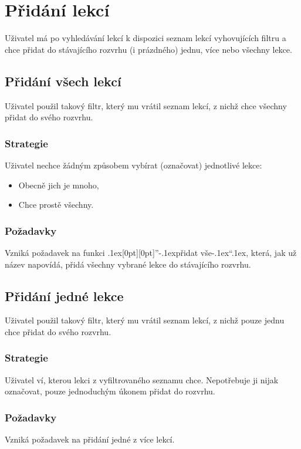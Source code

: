 \documentclass[a4paper, 11pt]{article}
\def\bq{\mbox{\kern.1ex\protect\raisebox{-1.3ex}[0pt][0pt]{''}\kern-.1ex}}
\def\eq{\mbox{\kern-.1ex``\kern.1ex}}
\gdef\uv#1{\bq #1\eq}
\begin{document}
\section{Přidání lekcí}
Uživatel má po vyhledávání lekcí k dispozici seznam lekcí vyhovujících filtru a chce přidat do stávajícího rozvrhu (i prázdného) jednu, více nebo všechny lekce.

\subsection{Přidání všech lekcí}
Uživatel použil takový filtr, který mu vrátil seznam lekcí, z nichž chce všechny přidat do svého rozvrhu.

\subsubsection{Strategie}
Uživatel nechce žádným způsobem vybírat (označovat) jednotlivé lekce:
\begin{itemize}
\item Obecně jich je mnoho,
\item Chce prostě všechny.
\end{itemize}

\subsubsection{Požadavky}
Vzniká požadavek na funkci \uv{přidat vše}, která, jak už název napovídá, přidá všechny vybrané lekce do stávajícího rozvrhu.

\subsection{Přidání jedné lekce}
Uživatel použil takový filtr, který mu vrátil seznam lekcí, z nichž pouze jednu chce přidat do svého rozvrhu.

\subsubsection{Strategie}
Uživatel ví, kterou lekci z vyfiltrovaného seznamu chce. Nepotřebuje ji nijak označovat, pouze jednoduchým úkonem přidat do rozvrhu.

\subsubsection{Požadavky}
Vzniká požadavek na přidání jedné z více lekcí.
\end{document}

